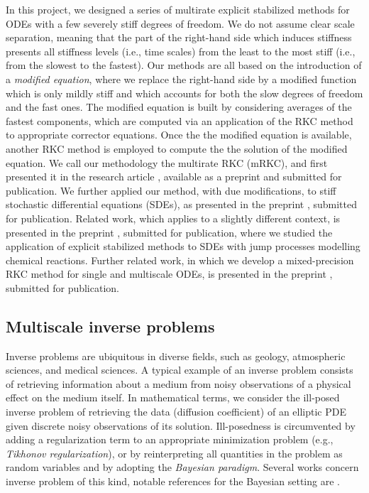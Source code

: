 \documentclass[10pt]{article}
\begin{document}
In this project, we designed a series of multirate explicit stabilized methods for ODEs with a few severely stiff degrees of freedom. We do not assume clear scale separation, meaning that the part of the right-hand side which induces stiffness presents all stiffness levels (i.e., time scales) from the least to the most stiff (i.e., from the slowest to the fastest). Our methods are all based on the introduction of a \textit{modified equation}, where we replace the right-hand side by a modified function which is only mildly stiff and which accounts for both the slow degrees of freedom and the fast ones. The modified equation is built by considering averages of the fastest components, which are computed via an application of the RKC method to appropriate corrector equations. Once the the modified equation is available, another RKC method is employed to compute the the solution of the modified equation. We call our methodology the multirate RKC (mRKC), and first presented it in the research article \cite{AGR20}, available as a preprint and submitted for publication. We further applied our method, with due modifications, to stiff stochastic differential equations (SDEs), as presented in the preprint \cite{AbR20c}, submitted for publication. Related work, which applies to a slightly different context, is presented in the preprint \cite{AGR21}, submitted for publication, where we studied the application of explicit stabilized methods to SDEs with jump processes modelling chemical reactions. Further related work, in which we develop a mixed-precision RKC method for single and multiscale ODEs, is presented in the preprint \cite{CrR21}, submitted for publication. 

\subsection{Multiscale inverse problems}\label{sec:AndreaDB}

Inverse problems are ubiquitous in diverse fields, such as geology, atmospheric sciences, and medical sciences. A typical example of an inverse problem consists of retrieving information about a medium from noisy observations of a physical effect on the medium itself. In mathematical terms, we consider the ill-posed inverse problem of retrieving the data (diffusion coefficient) of an elliptic PDE given discrete noisy observations of its solution. Ill-posedness is circumvented by adding a regularization term to an appropriate minimization problem (e.g., \textit{Tikhonov regularization}), or by reinterpreting all quantities in the problem as random variables and by adopting the \textit{Bayesian paradigm}. Several works concern inverse problem of this kind, notable references for the Bayesian setting are \cite{CDS10,DaS16,Stu10}.
\end{document}
